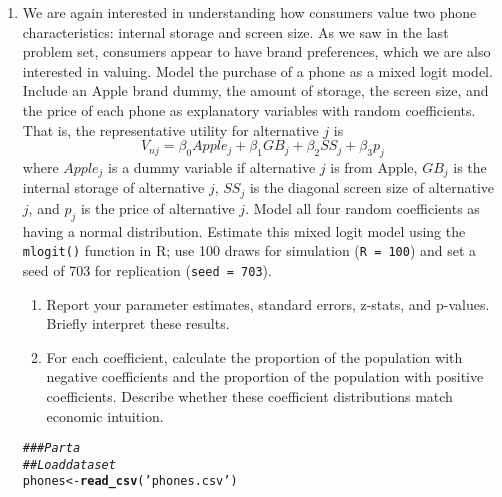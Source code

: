 \documentclass[11pt,letterpaper]{article}\usepackage[]{graphicx}\usepackage[]{color}
\makeatletter
\newcommand{\hlstr}[1]{\textcolor[rgb]{0.192,0.494,0.8}{#1}}%
\newcommand{\hlcom}[1]{\textcolor[rgb]{0.678,0.584,0.686}{\textit{#1}}}%
\newcommand{\hlstd}[1]{\textcolor[rgb]{0.345,0.345,0.345}{#1}}%
\newcommand{\hlkwb}[1]{\textcolor[rgb]{0.69,0.353,0.396}{#1}}%
\newcommand{\hlkwd}[1]{\textcolor[rgb]{0.737,0.353,0.396}{\textbf{#1}}}%
\newenvironment{kframe}{%
 \def\at@end@of@kframe{}%
 \ifinner\ifhmode%
  \def\at@end@of@kframe{\end{minipage}}%
  \begin{minipage}{\columnwidth}%
 \fi\fi%
 \def\FrameCommand##1{\hskip\@totalleftmargin \hskip-\fboxsep
 \colorbox{shadecolor}{##1}\hskip-\fboxsep
     \hskip-\linewidth \hskip-\@totalleftmargin \hskip\columnwidth}%
 \MakeFramed {\advance\hsize-\width
   \@totalleftmargin\z@ \linewidth\hsize
   \@setminipage}}%
 {\par\unskip\endMakeFramed%
 \at@end@of@kframe}
\newenvironment{knitrout}{}{} %
\makeatother
\begin{document}
\begin{enumerate}[label=\alph*., leftmargin=*]
	\item We are again interested in understanding how consumers value two phone characteristics: internal storage and screen size. As we saw in the last problem set, consumers appear to have brand preferences, which we are also interested in valuing. Model the purchase of a phone as a mixed logit model. Include an Apple brand dummy, the amount of storage, the screen size, and the price of each phone as explanatory variables with random coefficients. That is, the representative utility for alternative $j$ is
	$$V_{nj} = \beta_0 Apple_j + \beta_1 GB_j + \beta_2 SS_j + \beta_3 p_j$$
	where $Apple_j$ is a dummy variable if alternative $j$ is from Apple, $GB_j$ is the internal storage of alternative $j$, $SS_j$ is the diagonal screen size of alternative $j$, and $p_j$ is the price of alternative $j$. Model all four random coefficients as having a normal distribution. Estimate this mixed logit model using the \texttt{mlogit()} function in R; use 100 draws for simulation (\texttt{R = 100}) and set a seed of 703 for replication (\texttt{seed = 703}).
	\begin{enumerate}[label=\roman*.]
		\item Report your parameter estimates, standard errors, z-stats, and p-values. Briefly interpret these results. 
		\item For each coefficient, calculate the proportion of the population with negative coefficients and the proportion of the population with positive coefficients. Describe whether these coefficient distributions match economic intuition.
	\end{enumerate}

\begin{knitrout}
\color{fgcolor}\begin{kframe}
\begin{alltt}
\hlcom{### Part a}
\hlcom{## Load dataset}
\hlstd{phones} \hlkwb{<-} \hlkwd{read_csv}\hlstd{(}\hlstr{'phones.csv'}\hlstd{)}
\end{alltt}



\end{kframe}
\end{knitrout}
\end{enumerate}
\end{document}
